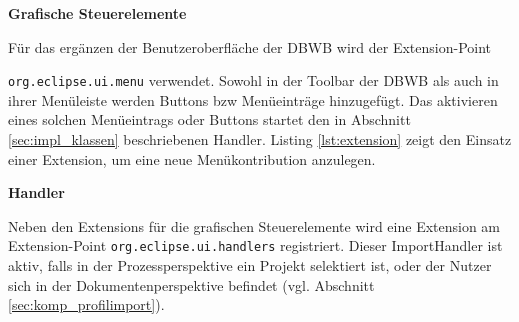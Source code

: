 {{{{\textbf{Grafische Steuerelemente}{

Für das ergänzen der Benutzeroberfläche der \ac {DBWB} wird der Extension-Point 

\texttt{org.eclipse.ui.menu} verwendet. Sowohl in der Toolbar der \ac{DBWB} als auch in ihrer Menüleiste werden Buttons bzw Menüeinträge hinzugefügt. Das aktivieren eines solchen Menüeintrags oder Buttons startet den in Abschnitt \ref{sec:impl_klassen} beschriebenen Handler. Listing \ref{lst:extension} zeigt den Einsatz einer Extension, um eine neue Menükontribution anzulegen.

}
\textbf{Handler}{

Neben den Extensions für die grafischen Steuerelemente wird eine Extension am Extension-Point \texttt{org.eclipse.ui.handlers} registriert. Dieser ImportHandler ist aktiv, falls in der Prozessperspektive ein Projekt selektiert ist, oder der Nutzer sich in der Dokumentenperspektive befindet (vgl. Abschnitt \ref{sec:komp_profilimport}). 
}

}}}}
